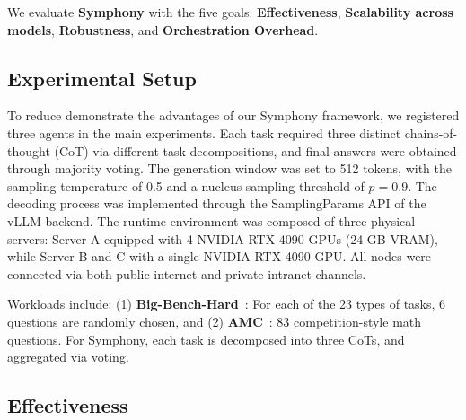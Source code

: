 \documentclass{article}
\begin{document}
We evaluate \textbf{Symphony} with the five goals: \textbf{Effectiveness}, \textbf{Scalability across models}, \textbf{Robustness}, and \textbf{Orchestration Overhead}.

\subsection{Experimental Setup}

To reduce demonstrate the advantages of our Symphony framework, we registered three agents in the main experiments. Each task required three distinct chains-of-thought (CoT) via different task decompositions, and final answers were obtained through majority voting. The generation window was set to 512 tokens, with the sampling temperature of 0.5 and a nucleus sampling threshold of $p=0.9$. The decoding process was implemented through the SamplingParams API of the vLLM backend. The runtime environment was composed of three physical servers: Server A equipped with 4 NVIDIA RTX 4090 GPUs (24 GB VRAM), while Server B and C with a single NVIDIA RTX 4090 GPU. All nodes were connected via both public internet and private intranet channels.

Workloads include: (1) \textbf{Big-Bench-Hard}~\cite{srivastava2022beyond}: For each of the 23 types of tasks, 6 questions are randomly chosen, and (2) \textbf{AMC}~\cite{suzgun2022challenging}: 83 competition-style math questions. For Symphony, each task is decomposed into three CoTs, and aggregated via voting.

\subsection{Effectiveness}

\begin{table}[!ht]
\centering
\caption{Accuracy (\%) of Symphony and simplified variants on BBH and AMC benchmarks.}
\renewcommand{\arraystretch}{1.3} %
\label{tab:model_comparison}
\end{table}
\end{document}
